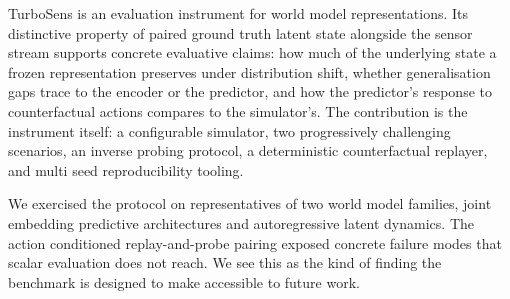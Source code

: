 \documentclass{article}
\begin{document}
TurboSens is an evaluation instrument for world model representations. Its distinctive property of paired ground truth latent state alongside the sensor stream supports concrete evaluative claims: how much of the underlying state a frozen representation preserves under distribution shift, whether generalisation gaps trace to the encoder or the predictor, and how the predictor's response to counterfactual actions compares to the simulator's. The contribution is the instrument itself: a configurable simulator, two progressively challenging scenarios, an inverse probing protocol, a deterministic counterfactual replayer, and multi seed reproducibility tooling.

We exercised the protocol on representatives of two world model families, joint embedding predictive architectures and autoregressive latent dynamics. The action conditioned replay-and-probe pairing exposed concrete failure modes that scalar evaluation does not reach. We see this as the kind of finding the benchmark is designed to make accessible to future work.



















\appendix







\newpage

\end{document}
